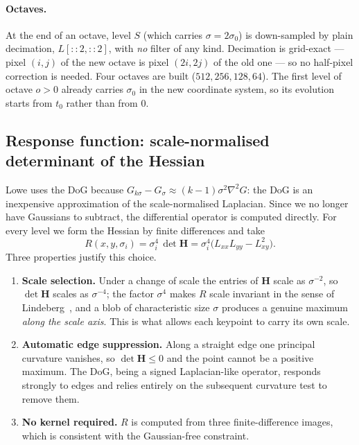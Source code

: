 \documentclass[11pt,a4paper]{article}
\begin{document}
\paragraph{Octaves.} At the end of an octave, level $S$ (which carries
$\sigma=2\sigma_0$) is down-sampled by plain decimation, $L[::2,::2]$, with
\emph{no} filter of any kind. Decimation is grid-exact --- pixel $(i,j)$ of the
new octave is pixel $(2i,2j)$ of the old one --- so no half-pixel correction is
needed. Four octaves are built ($512,256,128,64$). The first level of octave
$o>0$ already carries $\sigma_0$ in the new coordinate system, so its evolution
starts from $t_0$ rather than from $0$.

\subsection{Response function: scale-normalised determinant of the Hessian}

Lowe uses the DoG because
$G_{k\sigma}-G_{\sigma}\approx(k-1)\sigma^{2}\nabla^{2}G$: the DoG is an
inexpensive approximation of the scale-normalised Laplacian. Since we no longer
have Gaussians to subtract, the differential operator is computed directly.
For every level we form the Hessian by finite differences and take
\begin{equation}
R(x,y,\sigma_i)=\sigma_i^{4}\,\det\mathbf{H}
=\sigma_i^{4}\bigl(L_{xx}L_{yy}-L_{xy}^{2}\bigr).
\label{eq:response}
\end{equation}
Three properties justify this choice.
\begin{enumerate}\itemsep2pt
\item \textbf{Scale selection.} Under a change of scale the entries of
$\mathbf{H}$ scale as $\sigma^{-2}$, so $\det\mathbf{H}$ scales as
$\sigma^{-4}$; the factor $\sigma^{4}$ makes $R$ scale invariant in the sense
of Lindeberg~\cite{lindeberg1998}, and a blob of characteristic size $\sigma$
produces a genuine maximum \emph{along the scale axis}. This is what allows
each keypoint to carry its own scale.
\item \textbf{Automatic edge suppression.} Along a straight edge one principal
curvature vanishes, so $\det\mathbf{H}\le0$ and the point cannot be a positive
maximum. The DoG, being a signed Laplacian-like operator, responds strongly to
edges and relies entirely on the subsequent curvature test to remove them.
\item \textbf{No kernel required.} $R$ is computed from three finite-difference
images, which is consistent with the Gaussian-free constraint.
\end{enumerate}
\end{document}
